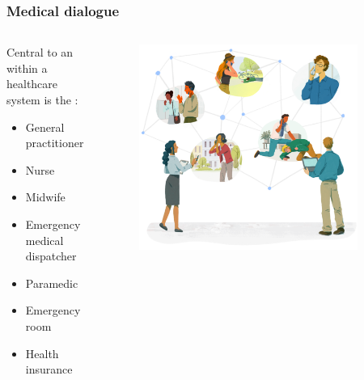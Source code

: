 \begin{frame}[t]
    \frametitle{Medical dialogue}
    \begin{columns}[t]
        \begin{column}{0.5\textwidth}
            Central to an  within a healthcare system is the :
            \begin{itemize}
                \item <1> General practitioner
                \item <1> Nurse
                \item <1> Midwife
                \item <1> Emergency medical dispatcher
                \item <1> Paramedic
                \item <1> Emergency room
                \item <1> Health insurance
            \end{itemize}
        \end{column}
        \begin{column}{0.55\textwidth}
            \vspace{-2em}
            \begin{figure}[t]
                \centering
                \includegraphics[width=0.9\textwidth]{figures/corti_sketch_conversations.png}
            \end{figure}
        \end{column}
    \end{columns}

\end{frame}


